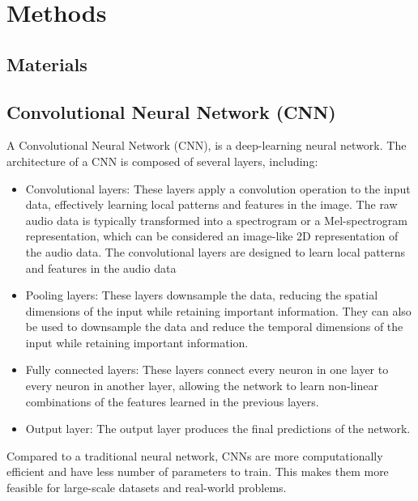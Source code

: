 \chapter{Methods}

\section{Materials}

\section{Convolutional Neural Network (CNN)}

A Convolutional Neural Network (CNN), is a deep-learning neural network. The architecture of a CNN is composed of several layers, including:

\begin{itemize}

\item Convolutional layers: These layers apply a convolution operation to the input data, effectively learning local patterns and features in the image. The raw audio data is typically transformed into a spectrogram or a Mel-spectrogram representation, which can be considered an image-like 2D representation of the audio data. The convolutional layers are designed to learn local patterns and features in the audio data
\vspace*{3mm}

\item Pooling layers: These layers downsample the data, reducing the spatial dimensions of the input while retaining important information. They can also be used to downsample the data and reduce the temporal dimensions of the input while retaining important information. 
\vspace*{3mm}

\item Fully connected layers: These layers connect every neuron in one layer to every neuron in another layer, allowing the network to learn non-linear combinations of the features learned in the previous layers.
\vspace*{3mm}

\item Output layer: The output layer produces the final predictions of the network.
\end{itemize}

Compared to a traditional neural network, CNNs are more computationally efficient and have less number of parameters to train. This makes them more feasible for large-scale datasets and real-world problems.

